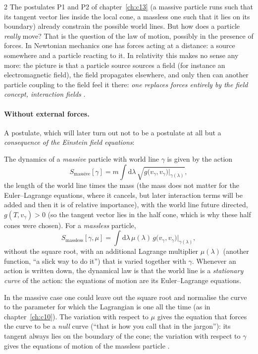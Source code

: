 \begin{paracol}{2}
The postulates P1 and P2 of chapter~\ref{ch:c13} (a massive particle runs such that its tangent vector lies inside the local cone, a massless one such that it lies on its boundary) already constrain the possible world lines. But how does a particle \emph{really} move? That is the question of the law of motion, possibly in the presence of forces. In Newtonian mechanics one has forces acting at a distance: a source somewhere and a particle reacting to it. In relativity this makes no sense any more: the picture is that a particle source sources a field (for instance an electromagnetic field), the field propagates elsewhere, and only then can another particle coupling to the field feel it there: \emph{one replaces forces entirely by the field concept, interaction fields} .

\paragraph{Without external forces.} A postulate, which will later turn out not to be a postulate at all but a \emph{consequence of the Einstein field equations}:

\begin{definition}\label{def:c14-actions}
The dynamics of a \emph{massive} particle with world line $\gamma$ is given by the action
\[
  S_{\mathrm{massive}}[\gamma]=m\int\mathrm d\lambda\,\sqrt{g\bigl(v_\gamma,v_\gamma\bigr)\big|_{\gamma(\lambda)}},
\]
the length of the world line times the mass (the mass does not matter for the Euler--Lagrange equations, where it cancels, but later interaction terms will be added and then it is of relative importance), with the world line future directed, $g(T,v_\gamma)>0$ (so the tangent vector lies in the half cone, which is why these half cones were chosen). For a \emph{massless} particle,
\[
  S_{\mathrm{massless}}[\gamma,\mu]=\int\mathrm d\lambda\,\mu(\lambda)\,g\bigl(v_\gamma,v_\gamma\bigr)\big|_{\gamma(\lambda)},
\]
without the square root, with an additional Lagrange multiplier $\mu(\lambda)$ (another function, ``a slick way to do it'') that is varied together with $\gamma$. Whenever an action is written down, the dynamical law is that the world line is a \emph{stationary curve} of the action: the equations of motion are its Euler--Lagrange equations.
\end{definition}
In the massive case one could leave out the square root and normalise the curve to the parameter for which the Lagrangian is one all the time (as in chapter~\ref{ch:c10}). The variation with respect to $\mu$ gives the equation that forces the curve to be a \emph{null} curve (``that is how you call that in the jargon''): its tangent always lies on the boundary of the cone; the variation with respect to $\gamma$ gives the equations of motion of the massless particle .


\end{paracol}
